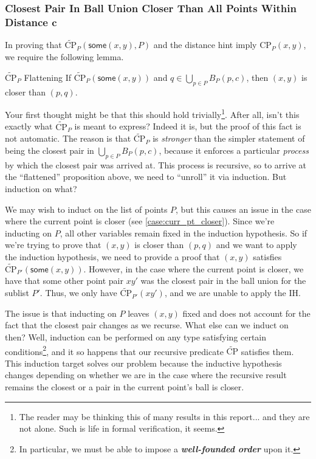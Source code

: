 \documentclass{article}
\begin{document}


\subsubsection{Closest Pair In Ball Union Closer Than All Points Within Distance $\mathbf{c}$}
In proving that $\widetilde{\text{CP}}_P(\mathsf{some}(x, y), P)$ and the distance hint imply $\text{CP}_P(x, y)$, we require the following lemma.
\begin{tcblemma}{$\widetilde{\text{CP}}_P$ Flattening}{}
  If $\widetilde{\text{CP}}_P(\mathsf{some}(x, y))$ and $q \in \bigcup_{p \in P} B_P(p, c)$, then $(x, y)$ is closer than $(p, q)$.
\end{tcblemma}
Your first thought might be that this should hold trivially\footnote{
  The reader may be thinking this of many results in this report... and they are not alone.
  Such is life in formal verification, it seems.
}.
After all, isn't this exactly what $\widetilde{\text{CP}}_P$ is meant to express?
Indeed it is, but the proof of this fact is not automatic.
The reason is that $\widetilde{\text{CP}}_P$ is \textit{stronger} than the simpler statement of being the closest pair in $\bigcup_{p \in P} B_P(p, c)$, because it enforces a particular \textit{process} by which the closest pair was arrived at.
This process is recursive, so to arrive at the ``flattened'' proposition above, we need to ``unroll'' it via induction.
But induction on what?

We may wish to induct on the list of points $P$, but this causes an issue in the case where the current point is closer (see \ref{case:curr_pt_closer}).
Since we're inducting on $P$, all other variables remain fixed in the induction hypothesis.
So if we're trying to prove that $(x,y)$ is closer than $(p,q)$ and we want to apply the induction hypothesis, we need to provide a proof that $(x, y)$ satisfies $\widetilde{\text{CP}}_{P'}(\mathsf{some}(x, y))$.
However, in the case where the current point is closer, we have that some other point pair $x\!y'$ was the closest pair in the ball union for the sublist $P'$.
Thus, we only have $\widetilde{\text{CP}}_{P'}(x\!y')$, and we are unable to apply the IH.

The issue is that inducting on $P$ leaves $(x, y)$ fixed and does not account for the fact that the closest pair changes as we recurse.
What else can we induct on then?
Well, induction can be performed on any type satisfying certain conditions\footnote{In particular, we must be able to impose a \textbf{\textit{well-founded order}} upon it.}, and it so happens that our recursive predicate $\widetilde{\text{CP}}$ satisfies them.
This induction target solves our problem because the inductive hypothesis changes depending on whether we are in the case where the recursive result remains the closest or a pair in the current point's ball is closer.
\end{document}
